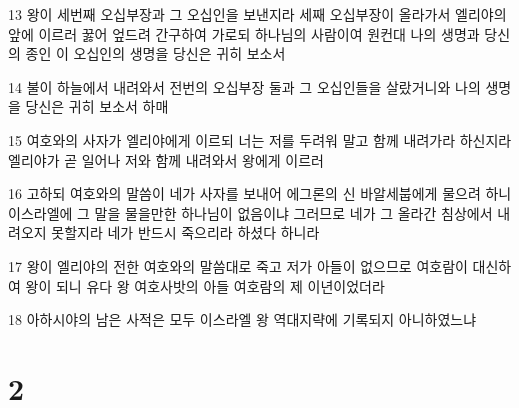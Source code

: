 \par 13 왕이 세번째 오십부장과 그 오십인을 보낸지라 세째 오십부장이 올라가서 엘리야의 앞에 이르러 꿇어 엎드려 간구하여 가로되 하나님의 사람이여 원컨대 나의 생명과 당신의 종인 이 오십인의 생명을 당신은 귀히 보소서
\par 14 불이 하늘에서 내려와서 전번의 오십부장 둘과 그 오십인들을 살랐거니와 나의 생명을 당신은 귀히 보소서 하매
\par 15 여호와의 사자가 엘리야에게 이르되 너는 저를 두려워 말고 함께 내려가라 하신지라 엘리야가 곧 일어나 저와 함께 내려와서 왕에게 이르러
\par 16 고하되 여호와의 말씀이 네가 사자를 보내어 에그론의 신 바알세붑에게 물으려 하니 이스라엘에 그 말을 물을만한 하나님이 없음이냐 그러므로 네가 그 올라간 침상에서 내려오지 못할지라 네가 반드시 죽으리라 하셨다 하니라
\par 17 왕이 엘리야의 전한 여호와의 말씀대로 죽고 저가 아들이 없으므로 여호람이 대신하여 왕이 되니 유다 왕 여호사밧의 아들 여호람의 제 이년이었더라
\par 18 아하시야의 남은 사적은 모두 이스라엘 왕 역대지략에 기록되지 아니하였느냐

\chapter{2}


